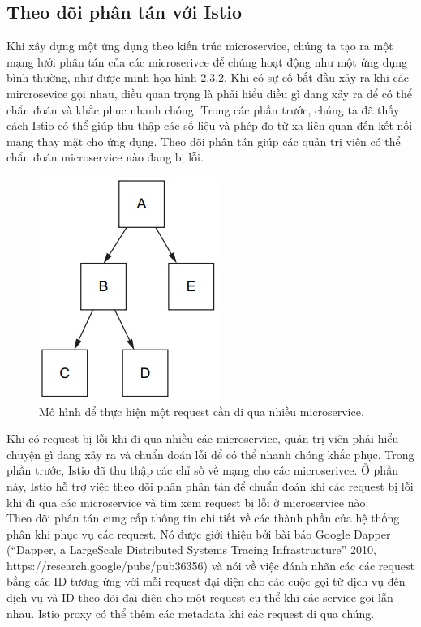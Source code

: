 \documentclass[12pt,a4paper]{report}
\begin{document}
{{\begin{figure}[h]
\end{figure}
\pagebreak
	\subsection{Theo dõi phân tán với Istio}
		{\hspace{0.6cm}Khi xây dựng một ứng dụng theo kiến trúc microservice, chúng ta tạo ra một mạng lưới phân tán của các microserivce để chúng hoạt động như một ứng dụng bình thường, như được minh họa hình 2.3.2. Khi có sự cố bắt đầu xảy ra khi các mircrosevice gọi nhau, điều quan trọng là phải hiểu điều gì đang xảy ra để có thể chẩn đoán và khắc phục nhanh chóng. Trong các phần trước, chúng ta đã thấy cách Istio có thể giúp thu thập các số liệu và phép đo từ xa liên quan đến kết nối mạng thay mặt cho ứng dụng. Theo dõi phân tán giúp các quản trị viên có thể chẩn đoán microservice nào đang bị lỗi.}\\
			
		\begin{figure}[h]
			\centering
			\includegraphics[width=0.3\linewidth]{Pics/Untitled}
			\caption{Mô hình để thực hiện một request cần đi qua nhiều microservice.}
			\label{fig:untitled}
		\end{figure}
	
		Khi có request bị lỗi khi đi qua nhiều các microservice, quản trị viên phải hiểu chuyện gì đang xảy ra và chuẩn đoán lỗi để có thể nhanh chóng khắc phục. Trong phần trước, Istio đã thu thập các chỉ số về mạng cho các microserivce. Ở phần này, Istio hỗ trợ việc theo dõi phân phân tán để chuẩn đoán khi các request bị lỗi khi đi qua các microservice và tìm xem request bị lỗi ở microservice nào.\\
		
		Theo dõi phân tán cung cấp thông tin chi tiết về các thành phần của hệ thống phân khi phục vụ các request. Nó được giới thiệu bởi bài báo Google Dapper (“Dapper, a LargeScale Distributed Systems Tracing Infrastructure” 2010, https://research.google/pubs/pub36356) 
		và nói về việc đánh nhãn các các request bằng các ID tương ứng với mỗi request đại diện cho các cuộc gọi từ dịch vụ đến dịch vụ và ID theo dõi đại diện cho một request cụ thể khi các service gọi lẫn nhau. Istio proxy có thể thêm các metadata khi các request đi qua chúng.\\
		
}}
\end{document}
